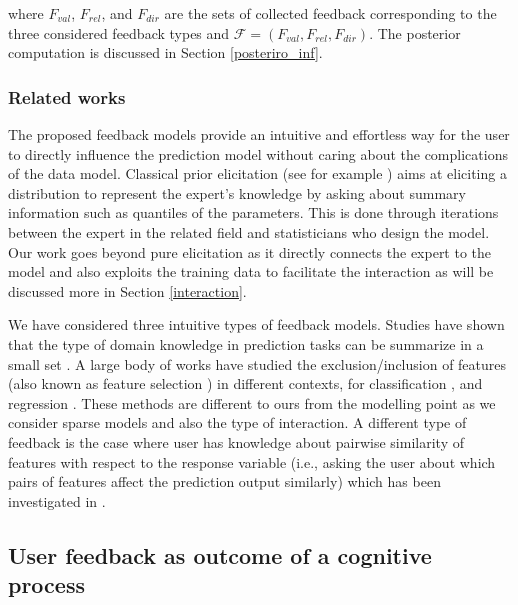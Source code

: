 \documentclass[dissertation,math,vertlayout,pdfa,colorlinks]{aaltoseries}
\newcommand{\bF}{\mathcal{F}}
\begin{document}
\noindent where $F_{val}$, $F_{rel}$, and $F_{dir}$ are the sets of collected feedback corresponding to the three considered feedback types and $\bF = (F_{val}, F_{rel}, F_{dir})$. The posterior computation is discussed in Section \ref{posteriro_inf}.




\subsubsection{Related works}

The proposed feedback models provide an intuitive and effortless way for the user to directly influence the prediction model without caring about the complications of the data model. Classical prior elicitation (see for example \cite{OHagan06,garthwaite2005statistical}) aims at eliciting a distribution to represent the expert's knowledge by asking about summary information such as quantiles of the parameters. This is done through iterations between the expert in the related field and statisticians who design the model. Our work goes beyond pure elicitation as it directly connects the expert to the model and also exploits the training data to facilitate the interaction as will be discussed more in Section \ref{interaction}.

We have considered three intuitive types of feedback models. Studies have shown that the type of domain knowledge in prediction tasks can be summarize in a small set \cite{concept_driven_CHI2019}. A large body of works have studied the exclusion/inclusion of features (also known as feature selection \cite{Correia2019HumanintheLoopFS}) in different contexts, for classification  \cite{raghavan2006active,druck2009active,settles2011closing}, and regression \cite{Micallef_elicitation}. These methods are different to ours from the modelling point as we consider sparse models and also the type of interaction. A different type of feedback is the case where user has knowledge about pairwise similarity of features with respect to the response variable (i.e., asking the user about which  pairs of features affect the prediction output similarly) which has been investigated in \cite{Homayun_pairwise_UMAP,Homayun_pairwise_ijcai2019}. 

\subsection{User feedback as outcome of a cognitive process}
\end{document}
